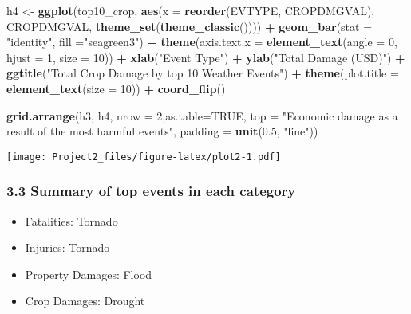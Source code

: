 \documentclass[]{article}
\newenvironment{Shaded}{\begin{snugshade}}{\end{snugshade}}
\newcommand{\DataTypeTok}[1]{\textcolor[rgb]{0.13,0.29,0.53}{#1}}
\newcommand{\DecValTok}[1]{\textcolor[rgb]{0.00,0.00,0.81}{#1}}
\newcommand{\FloatTok}[1]{\textcolor[rgb]{0.00,0.00,0.81}{#1}}
\newcommand{\KeywordTok}[1]{\textcolor[rgb]{0.13,0.29,0.53}{\textbf{#1}}}
\newcommand{\NormalTok}[1]{#1}
\newcommand{\OperatorTok}[1]{\textcolor[rgb]{0.81,0.36,0.00}{\textbf{#1}}}
\newcommand{\OtherTok}[1]{\textcolor[rgb]{0.56,0.35,0.01}{#1}}
\newcommand{\StringTok}[1]{\textcolor[rgb]{0.31,0.60,0.02}{#1}}
\providecommand{\tightlist}{%
  \setlength{\itemsep}{0pt}\setlength{\parskip}{0pt}}
\begin{document}
\begin{Shaded}
\begin{Highlighting}[]
\NormalTok{h4 <-}\StringTok{ }\KeywordTok{ggplot}\NormalTok{(top10_crop, }\KeywordTok{aes}\NormalTok{(}\DataTypeTok{x =}  \KeywordTok{reorder}\NormalTok{(EVTYPE, CROPDMGVAL), CROPDMGVAL, }\KeywordTok{theme_set}\NormalTok{(}\KeywordTok{theme_classic}\NormalTok{()))) }\OperatorTok{+}\StringTok{ }
\StringTok{        }\KeywordTok{geom_bar}\NormalTok{(}\DataTypeTok{stat =} \StringTok{"identity"}\NormalTok{, }\DataTypeTok{fill =}\StringTok{"seagreen3"}\NormalTok{) }\OperatorTok{+}\StringTok{ }
\StringTok{        }\KeywordTok{theme}\NormalTok{(}\DataTypeTok{axis.text.x =} \KeywordTok{element_text}\NormalTok{(}\DataTypeTok{angle =} \DecValTok{0}\NormalTok{, }\DataTypeTok{hjust =} \DecValTok{1}\NormalTok{, }\DataTypeTok{size =} \DecValTok{10}\NormalTok{)) }\OperatorTok{+}
\StringTok{        }
\StringTok{        }\KeywordTok{xlab}\NormalTok{(}\StringTok{"Event Type"}\NormalTok{) }\OperatorTok{+}\StringTok{ }\KeywordTok{ylab}\NormalTok{(}\StringTok{"Total Damage (USD)"}\NormalTok{) }\OperatorTok{+}\StringTok{ }\KeywordTok{ggtitle}\NormalTok{(}\StringTok{"Total Crop Damage by top 10 Weather Events"}\NormalTok{) }\OperatorTok{+}
\StringTok{        }\KeywordTok{theme}\NormalTok{(}\DataTypeTok{plot.title =} \KeywordTok{element_text}\NormalTok{(}\DataTypeTok{size =} \DecValTok{10}\NormalTok{)) }\OperatorTok{+}\StringTok{ }\KeywordTok{coord_flip}\NormalTok{()}
\end{Highlighting}
\end{Shaded}

\begin{Shaded}
\begin{Highlighting}[]
\KeywordTok{grid.arrange}\NormalTok{(h3, h4, }\DataTypeTok{nrow =} \DecValTok{2}\NormalTok{,}\DataTypeTok{as.table=}\OtherTok{TRUE}\NormalTok{, }\DataTypeTok{top =} \StringTok{"Economic damage as a result of the most harmful events"}\NormalTok{, }\DataTypeTok{padding =} \KeywordTok{unit}\NormalTok{(}\FloatTok{0.5}\NormalTok{, }\StringTok{"line"}\NormalTok{))}
\end{Highlighting}
\end{Shaded}

\texttt{[image: Project2\_files/figure-latex/plot2-1.pdf]}

\hypertarget{summary-of-top-events-in-each-category}{%
\subsubsection{3.3 Summary of top events in each
category}\label{summary-of-top-events-in-each-category}}

\begin{itemize}
\tightlist
\item
  Fatalities: Tornado\\
\item
  Injuries: Tornado\\
\item
  Property Damages: Flood\\
\item
  Crop Damages: Drought
\end{itemize}
\end{document}
